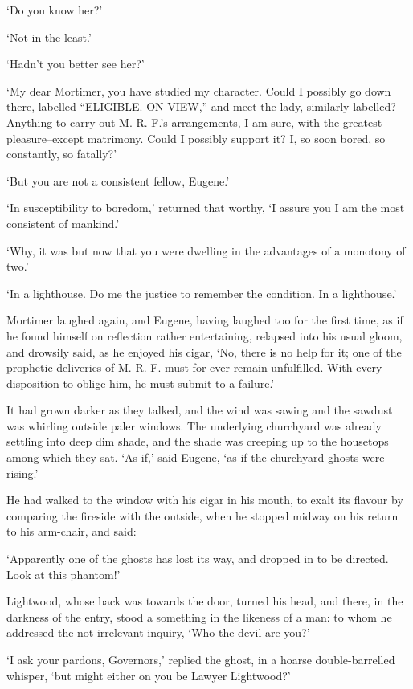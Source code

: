‘Do you know her?’

‘Not in the least.’

‘Hadn’t you better see her?’

‘My dear Mortimer, you have studied my character. Could I possibly go
down there, labelled “ELIGIBLE. ON VIEW,” and meet the lady, similarly
labelled? Anything to carry out M. R. F.’s arrangements, I am sure, with
the greatest pleasure--except matrimony. Could I possibly support it? I,
so soon bored, so constantly, so fatally?’

‘But you are not a consistent fellow, Eugene.’

‘In susceptibility to boredom,’ returned that worthy, ‘I assure you I am
the most consistent of mankind.’

‘Why, it was but now that you were dwelling in the advantages of a
monotony of two.’

‘In a lighthouse. Do me the justice to remember the condition. In a
lighthouse.’

Mortimer laughed again, and Eugene, having laughed too for the first
time, as if he found himself on reflection rather entertaining, relapsed
into his usual gloom, and drowsily said, as he enjoyed his cigar, ‘No,
there is no help for it; one of the prophetic deliveries of M. R. F.
must for ever remain unfulfilled. With every disposition to oblige him,
he must submit to a failure.’

It had grown darker as they talked, and the wind was sawing and the
sawdust was whirling outside paler windows. The underlying churchyard
was already settling into deep dim shade, and the shade was creeping up
to the housetops among which they sat. ‘As if,’ said Eugene, ‘as if the
churchyard ghosts were rising.’

He had walked to the window with his cigar in his mouth, to exalt its
flavour by comparing the fireside with the outside, when he stopped
midway on his return to his arm-chair, and said:

‘Apparently one of the ghosts has lost its way, and dropped in to be
directed. Look at this phantom!’

Lightwood, whose back was towards the door, turned his head, and there,
in the darkness of the entry, stood a something in the likeness of a
man: to whom he addressed the not irrelevant inquiry, ‘Who the devil are
you?’

‘I ask your pardons, Governors,’ replied the ghost, in a hoarse
double-barrelled whisper, ‘but might either on you be Lawyer Lightwood?’

